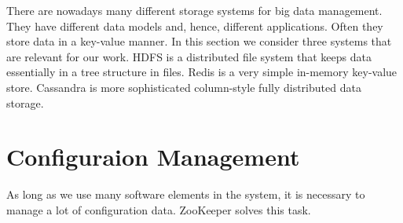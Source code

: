 There are nowadays many different storage systems for big data management.
They have different data models and, hence, different applications.
Often they store data in a key-value manner.
In this section we consider three systems that are relevant for our work.
HDFS is a distributed file system that keeps data essentially in a tree structure in files.
Redis is a very simple in-memory key-value store.
Cassandra is more sophisticated column-style fully distributed data storage.





\section{Configuraion Management}

As long as we use many software elements in the system, it is necessary to manage a lot of configuration data.
ZooKeeper solves this task.

